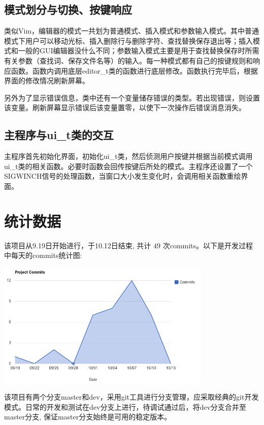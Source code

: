 \documentclass[a4paper,9pt]{article}
\begin{document}
\vspace{1em}
\subsection{模式划分与切换、按键响应}
类似Vim，编辑器的模式一共划为普通模式、插入模式和参数输入模式。其中普通模式下用户可以移动光标、插入删除行与删除字符、查找替换保存退出等；插入模式和一般的GUI编辑器没什么不同；参数输入模式主要是用于查找替换保存时所需有关参数（查找词、保存文件名等）的输入。每一种模式都有自己的按键规则和响应函数。函数内调用底层editor\_t类的函数进行底层修改。函数执行完毕后，根据界面的修改情况刷新屏幕。

另外为了显示错误信息，类中还有一个变量储存错误的类型。若出现错误，则设置该变量。刷新屏幕显示错误后该变量置零，以使下一次操作后错误消息消失。

\vspace{1em}
\subsection{主程序与ui\_t类的交互}
主程序首先初始化界面，初始化ui\_t类，然后侦测用户按键并根据当前模式调用ui\_t类的相关函数。必要时函数会回传按键后所处的模式。主程序还设置了一个SIGWINCH信号的处理函数，当窗口大小发生变化时，会调用相关函数重绘界面。

\newpage
\section{统计数据}
该项目从9.19日开始进行，于10.12日结束, 共计 $49$ 次commits。以下是开发过程中每天的commits统计图:

\begin{center}
\includegraphics[height=6cm]{commits.png}
\end{center}

该项目有两个分支master和dev，采用git工具进行分支管理，应采取经典的git开发模式。日常的开发和测试在dev分支上进行，待调试通过后，将dev分支合并至master分支, 保证master分支始终是可用的稳定版本。
\end{document}
